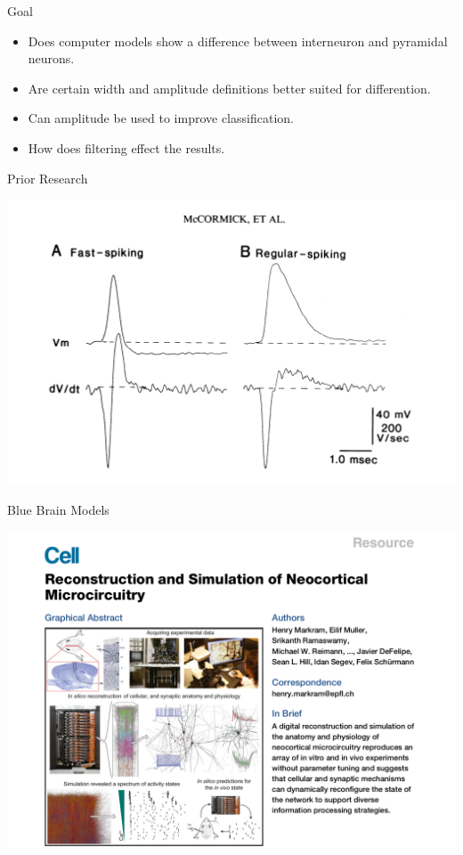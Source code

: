 \documentclass[aspectratio=169]{beamer}
\begin{document}
\begin{frame}{Goal}
    \begin{itemize}
        \item Does computer models show a difference between interneuron
            and pyramidal neurons.
        \item Are certain width and amplitude definitions better suited for 
            differention.
        \item Can amplitude be used to improve classification.
        \item How does filtering effect the results.
    \end{itemize}
\end{frame}

\begin{frame}{Prior Research}
    \begin{center}
        \includegraphics[width=.8\textwidth]{images/mc_cormick_fs_rs.png}
    \end{center}
\end{frame}

\begin{frame}{Blue Brain Models}
    \begin{center}
        \includegraphics[width=.6\textwidth]{images/markram_front.png}
    \end{center}
\end{frame}
\end{document}
